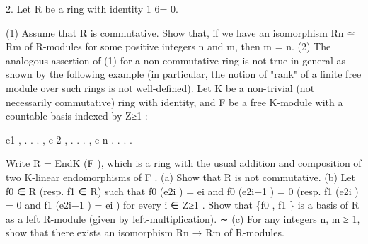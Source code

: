 \documentclass[UTF8,12pt]{ctexart}
\begin{document}
2. Let R be a ring with identity 1 6= 0.

(1) Assume that R is commutative. Show that, if we have an isomorphism Rn ≃ Rm of R-modules for some positive integers n and m, then m = n. (2) The analogous assertion of (1) for a non-commutative ring is not true in general as shown by the following example (in particular, the notion of "rank" of a finite free module over such rings is not well-defined). Let K be a non-trivial (not necessarily commutative) ring with identity, and F be a free K-module with a countable basis indexed by Z≥1 :

e1 , . . . , e 2 , . . . , e n . . . .

Write R = EndK (F ), which is a ring with the usual addition and composition of two K-linear endomorphisms of F . (a) Show that R is not commutative. (b) Let f0 ∈ R (resp. f1 ∈ R) such that f0 (e2i ) = ei and f0 (e2i−1 ) = 0 (resp. f1 (e2i ) = 0 and f1 (e2i−1 ) = ei ) for every i ∈ Z≥1 . Show that \{f0 , f1 \} is a basis of R as a left R-module (given by left-multiplication). ∼ (c) For any integers n, m ≥ 1, show that there exists an isomorphism Rn → Rm of R-modules.
\end{document}
